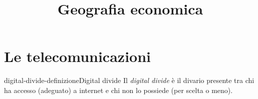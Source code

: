 \documentclass[preview]{standalone}
\begin{document}
\title{Geografia economica}
\genpage

\section{Le telecomunicazioni}

\begin{snippetdefinition}{digital-divide-definizione}{Digital divide}
    Il \textit{digital divide} è il divario presente tra chi ha accesso
    (adeguato) a internet e chi non lo possiede (per
    scelta o meno).
\end{snippetdefinition}

\end{document}
